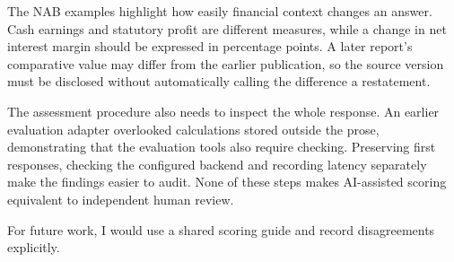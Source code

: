 The NAB examples highlight how easily financial context changes an answer. Cash earnings and statutory profit are different measures, while a change in net interest margin should be expressed in percentage points. A later report's comparative value may differ from the earlier publication, so the source version must be disclosed without automatically calling the difference a restatement.

The assessment procedure also needs to inspect the whole response. An earlier evaluation adapter overlooked calculations stored outside the prose, demonstrating that the evaluation tools also require checking. Preserving first responses, checking the configured backend and recording latency separately make the findings easier to audit. None of these steps makes AI-assisted scoring equivalent to independent human review.

For future work, I would use a shared scoring guide and record disagreements explicitly.
